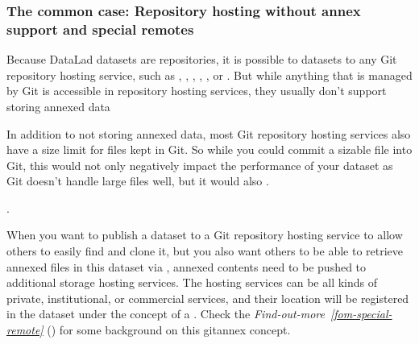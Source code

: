 \subsubsection{The common case: Repository hosting without annex support and special remotes}
\label{\detokenize{basics/101-138-sharethirdparty:the-common-case-repository-hosting-without-annex-support-and-special-remotes}}
\sphinxAtStartPar
Because DataLad datasets are {\hyperref[\detokenize{glossary:term-Git}]{}} repositories, it is possible to
 datasets to any Git repository hosting service, such as
{\hyperref[\detokenize{glossary:term-GitHub}]{}}, {\hyperref[\detokenize{glossary:term-GitLab}]{}}, {\hyperref[\detokenize{glossary:term-GIN}]{}}, {\hyperref[\detokenize{glossary:term-Bitbucket}]{}}, ,
or .
But while anything that is managed by Git is accessible in repository hosting services, they usually don’t support storing annexed data%
\begin{footnote}\sphinxAtStartFootnote
In addition to not storing annexed data, most Git repository hosting services also have a size limit for files kept in Git. So while you could  commit a sizable file into Git, this would not only negatively impact the performance of your dataset as Git doesn’t handle large files well, but it would also .
%
\end{footnote}.

\sphinxAtStartPar
When you want to publish a dataset to a Git repository hosting service to allow others to easily find and clone it, but you also want others to be able to retrieve annexed files in this dataset via , annexed contents need to be pushed to additional storage hosting services.
The hosting services can be all kinds of private, institutional, or commercial services, and their location will be registered in the dataset under the concept of a {\hyperref[\detokenize{glossary:term-special-remote}]{}}. Check the \textit{Find-out-more}~{\findoutmoreiconinline}\textit{\ref{fom-special-remote}} {\hyperref[\detokenize{basics/101-138-sharethirdparty:fom-special-remote}]{}} () for some background on this git\sphinxhyphen{}annex concept.

